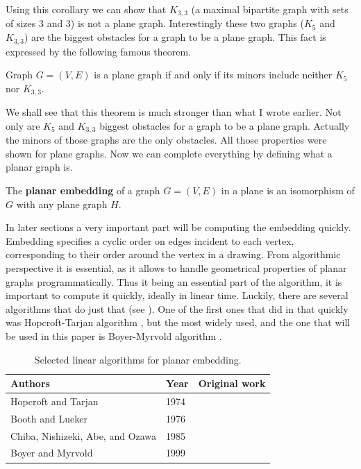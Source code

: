 Using this corollary we can show that $K_{3, 3}$ (a maximal bipartite graph with sets of sizes 3 and 3) is not a plane graph. Interestingly 
these two graphs ($K_5$ and $K_{3,3}$) are the biggest obstacles for a graph to be a plane graph. This fact is expressed by the following famous theorem.

\begin{theorem}  \label{thm:wagner}
    Graph $G = (V, E)$ is a plane graph if and only if its minors include neither $K_5$  nor $K_{3,3}$.
\end{theorem}

We shall see that this theorem is much stronger than what I wrote earlier. Not only are $K_5$ and $K_{3,3}$ biggest obstacles for a graph to 
be a plane graph. Actually the minors of those graphs are the only obstacles. All those properties were shown for plane graphs. Now we can 
complete everything by defining what a planar graph is.

\begin{defn}
\label{defn:embedding}
The \textbf{planar embedding} of a graph $G = (V, E)$ in a plane is an isomorphism
    of $G$ with any plane graph $H$.
\end{defn}

In later sections a very important part will be computing the embedding quickly. 
Embedding specifies a cyclic order on edges incident to each vertex, corresponding to 
their order around the vertex in a drawing. From algorithmic perspective it is 
essential, as it allows to handle geometrical properties of planar graphs programmatically.
Thus it being an essential part of the algorithm, it is important to compute it 
quickly, ideally in linear time. Luckily, there are several algorithms that do just that (see ).
One of the first ones that did in that quickly was Hopcroft-Tarjan algorithm \cite{hopcroft1974efficient}, but 
the most widely used, and the one that will be used in this paper is Boyer-Myrvold 
algorithm \cite{boyer2003stop}.

\begin{table}[htbp]
\centering
\caption{Selected linear algorithms for planar embedding.}
\label{tab:planar-embedding-algorithms}
\begin{tabularx}{\textwidth}{llX}
\hline
\textbf{Authors} & \textbf{Year} & \textbf{Original work} \\
\hline
Hopcroft and Tarjan
& 1974
&  \cite{hopcroft1974efficient}
\\
Booth and Lueker
& 1976
& \cite{booth1976testing}
\\
Chiba, Nishizeki, Abe, and Ozawa
& 1985
&  \cite{chiba1985linear}
\\
Boyer and Myrvold
& 1999
& \cite{boyer2003stop}
\\
\hline
\end{tabularx}
\end{table}

